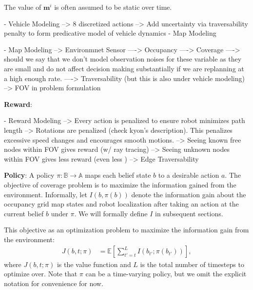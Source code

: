 \documentclass{article}
\newcommand{\ph}[1]{{\textbf{#1}:}} %
\begin{document}
The value of $\mathbf{m}^i$ is often assumed to be static over time.


- Vehicle Modeling
--> 8 discretized actions
--> Add uncertainty via traversability penalty to form predicative model of vehicle dynamics
- Map Modeling

- Map Modeling
--> Environmnet Sensor
----> Occupancy
----> Coverage
----> should we say that we don't model observation noises for these variable as they are small and do not affect decision making substantially if we are replanning at a high enough rate.
----> Traversability (but this is also under vehicle modeling)
--> FOV in problem formulation



\ph{Reward}

- Reward Modeling
--> Every action is penalized to ensure robot minimizes path length
--> Rotations are penalized (check kyon's description). This penalizes excessive speed changes and encourages smooth motions.
--> Seeing known free nodes within FOV gives reward (w/ ray tracing)
--> Seeing unknown nodes within FOV gives less reward (even less )
--> Edge Traversability

\ph{Policy} A policy $\pi : \mathbb{B} \rightarrow \mathbb{A}$ maps each belief state $b$ to a desirable action $a$. The objective of coverage problem is to maximize the information gained from the environment. Informally, let $I(b, \pi(b))$ denote the information gain about the occupancy grid map states and robot localization after taking an action at the current belief $b$ under $\pi$.  We will formally define $I$ in subsequent sections.

This objective as an optimization problem to maximize the information gain from the environment:
\begin{align}
  J(b,t;\pi) &= \mathbb{E} \left[ \sum_{t'=t}^{L} I(b_{t'}; \pi(b_{t'})) \right], \label{eq:artifactopt_cost}
\end{align}
where $J(b,t;\pi)$ is the value function and $L$ is the total number of timesteps to optimize over.  Note that $\pi$ can be a time-varying policy, but we omit the explicit notation for convenience for now.
\end{document}
